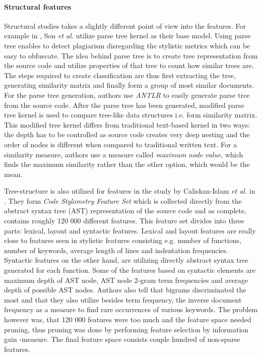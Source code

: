 \documentclass[english]{tktltiki2}
\theoremstyle{definition}
\theoremstyle{remark}
\begin{document}
\paragraph{Structural features}


Structural studies takes a slightly different point of view into the features. For example in \cite{Son:2013:APS:2508269.2508323}, Son \textit{et al.} utilize parse tree kernel as their base model. Using parse tree enables to detect plagiarism disregarding the stylistic metrics which can be easy to obfuscate. The idea behind parse tree is to create tree representation from the source code and utilize properties of that tree to count how similar trees are. The steps required to create classification are thus first extracting the tree, generating similarity matrix and finally form a group of most similar documents. For the parse tree generation, authors use \textit{ANTLR} to easily generate parse tree from the source code. After the parse tree has been generated, modified parse tree kernel is used to compare tree-like data structures i.e. form similarity matrix. This modified tree kernel differs from traditional text-based kernel in two ways: the depth has to be controlled as source code creates very deep nesting and the order of nodes is different when compared to traditional written text. For a similarity measure, authors use a measure called \textit{maximum node value}, which finds the maximum similarity rather than the other option, which would be the mean. 

Tree-structure is also utilized for features in the study by Caliskan-Islam \textit{et al.} in \cite{caliskan2015anonymizing}. They form \textit{Code Stylometry Feature Set} which is collected directly from the abstract syntax tree (AST) representation of the source code and as complete, contains roughly 120 000 different features. This feature set divides into three parts: lexical, layout and syntactic features. Lexical and layout features are really close to features seen in stylistic features consisting e.g. number of functions, number of keywords, average length of lines and indentation frequencies. Syntactic features on the other hand, are utilizing directly abstract syntax tree generated for each function. Some of the features based on syntactic elements are  maximum depth of AST node, AST node 2-gram term frequencies and average depth of possible AST nodes. Authors also tell that bigrams discriminated the most and that they also utilize besides term frequency, the inverse document frequency as a measure to find rare occurrences of various keywords. The problem however was, that 120 000 features were too much and the feature space needed pruning, thus pruning was done by performing feature selection by information gain -measure. The final feature space consists couple hundred of non-sparse features.
\end{document}
